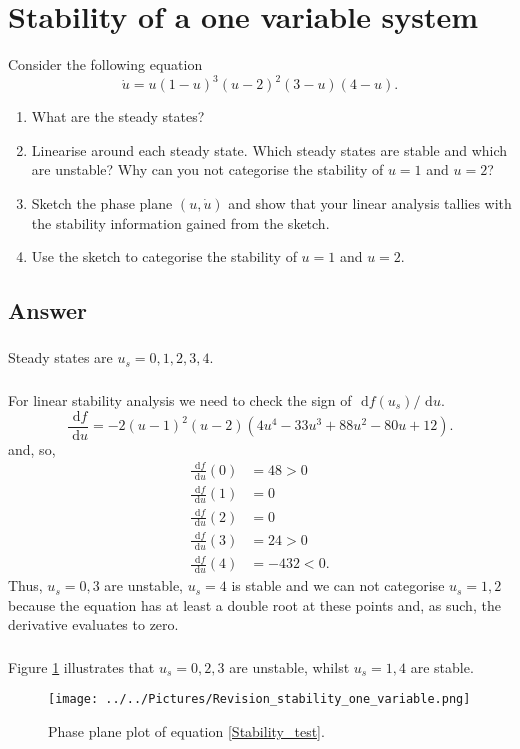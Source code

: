 \documentclass[]{article}
\newcommand{\bb}{\begin{equation}}
\newcommand{\ee}{\end{equation}}
\newcommand{\rd}{\text{ d}}
\newcommand{\fig}[1]{Figure \ref{#1}}
\newcommand{\eqn}[1]{equation \eqref{#1}}
\newcommand{\ttp}{.45\textwidth}
\begin{document}
\section{Stability of a one variable system}
Consider the following equation
\bb
\dot{u}=u(1-u)^3(u-2)^2(3-u)(4-u).\label{Stability_test}
\ee
\begin{enumerate}
\item What are the steady states?
\item Linearise around each steady state. Which steady states are stable and which are unstable? Why can you not categorise the stability of $u=1$ and $u=2$?
\item Sketch the phase plane $(u,\dot{u})$ and show that your linear analysis tallies with the stability information gained from the sketch.
\item Use the sketch to categorise the stability of $u=1$ and $u=2$.
\end{enumerate}
\begin{Answ}
\subsection{Answer}
\subsubsection{}
Steady states are $u_s=0,1,2,3,4$.
\subsubsection{}
For linear stability analysis we need to check the sign of $\rd f(u_s)/\rd u$.
\bb
\frac{\rd f}{\rd u}=-2(u-1)^2(u-2)(4u^4-33u^3+88u^2-80u+12).
\ee
and, so,
\begin{align}
\frac{\rd f}{\rd u}(0)&=48>0\nonumber\\
\frac{\rd f}{\rd u}(1)&=0\nonumber\\
\frac{\rd f}{\rd u}(2)&=0\nonumber\\
\frac{\rd f}{\rd u}(3)&=24>0\nonumber\\
\frac{\rd f}{\rd u}(4)&=-432<0\nonumber.
\end{align}
Thus, $u_s=0,3$ are unstable, $u_s=4$ is stable and we can not categorise $u_s=1,2$ because the equation has at least a double root at these points and, as such, the derivative evaluates to zero.
\subsubsection{}
\fig{Revision_stability_one_variable} illustrates that $u_s=0,2,3$ are unstable, whilst $u_s=1,4$ are stable.
\begin{figure}[h!!!tb]
\centering
\texttt{[image: ../../Pictures/Revision\_stability\_one\_variable.png]}
\caption{\label{Revision_stability_one_variable} Phase plane plot of \eqn{Stability_test}.}
\end{figure}
\end{Answ}
\end{document}
